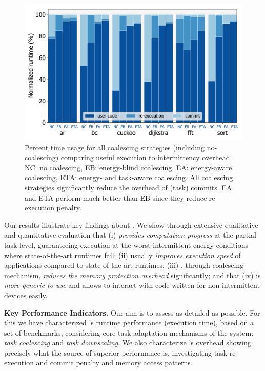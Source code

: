 \begin{figure}
	\centering
	\includegraphics[width=0.5\columnwidth]{figures/coalEfficiency}
	\caption{Percent time usage for all coalescing strategies (including no-coalescing) comparing useful execution to intermittency overhead. NC: no coalescing, EB: energy-blind coalescing, EA: energy-aware coalescing, ETA: energy- and task-aware coalescing. All \sys coalescing strategies significantly reduce the overhead of (task) commits. EA and ETA perform much better than EB since they reduce re-execution penalty. }
	\label{fig:overallOverheadBreakdown}
\end{figure}

Our results illustrate key findings about \sys. We show through extensive qualitative and quantitative evaluation that (i) \sys \emph{provides computation progress} at the partial task level, guaranteeing execution at the worst intermittent energy conditions where state-of-the-art runtimes fail; (ii) \sys usually \emph{improves execution speed} of applications compared to state-of-the-art runtimes; (iii) \sys, through coalescing mechanism, \emph{reduces the memory protection overhead} significantly; and  that (iv) \sys is \emph{more generic to use} and allows to interact with code written for non-intermittent devices easily.

\textbf{Key Performance Indicators.} Our aim is to assess \sys as detailed as possible. For this we have characterized \sys's runtime performance (execution time), based on a set of benchmarks, considering core task adaptation mechanisms of the system: \emph{task coalescing} and \emph{task downscaling}. We also characterize \sys's overhead showing precisely what the source of \sys superior performance is, investigating task re-execution and commit penalty and memory access patterns.

